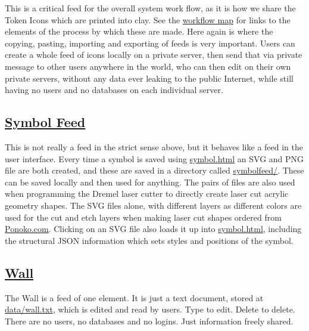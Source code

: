 This is a critical feed for the overall system work flow, as it is how
we share the Token Icons which are printed into clay. See the
\href{maps/workflow}{workflow map} for links to the elements of the
process by which these are made. Here again is where the copying,
pasting, importing and exporting of feeds is very important. Users can
create a whole feed of icons locally on a private server, then send that
via private message to other users anywhere in the world, who can then
edit on their own private servers, without any data ever leaking to the
public Internet, while still having no users and no databases on each
individual server.

\hypertarget{symbol-feed}{%
\subsection{\texorpdfstring{\href{symbolfeed.html}{Symbol
Feed}}{Symbol Feed}}\label{symbol-feed}}

This is not really a feed in the strict sense above, but it behaves like
a feed in the user interface. Every time a symbol is saved using
\url{symbol.html} an SVG and PNG file are both created, and these are
saved in a directory called \url{symbolfeed/}. These can be saved
locally and then used for anything. The pairs of files are also used
when programming the Dremel laser cutter to directly create laser cut
acrylic geometry shapes. The SVG files alone, with different layers as
different colors are used for the cut and etch layers when making laser
cut shapes ordered from \href{https://www.ponoko.com/}{Ponoko.com}.
Clicking on an SVG file also loads it up into \url{symbol.html},
including the structural JSON information which sets styles and
positions of the symbol.

\hypertarget{wall}{%
\subsection{\texorpdfstring{\href{wall.html}{Wall}}{Wall}}\label{wall}}

The Wall is a feed of one element. It is just a text document, stored at
\url{data/wall.txt}, which is edited and read by users. Type to edit.
Delete to delete. There are no users, no databases and no logins. Just
information freely shared.
